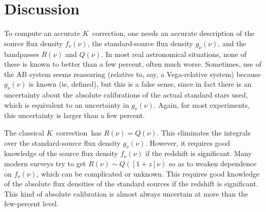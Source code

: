 \documentclass[preprint]{aastex}
\newcommand{\kcorrection}{$K$~correction}
\begin{document}
\section{Discussion}

To compute an accurate \kcorrection, one needs an accurate description
of the source flux density $f_{\nu}(\nu)$, the standard-source flux
density $g_{\nu}(\nu)$, and the bandpasses $R(\nu)$ and $Q(\nu)$.  In
most real astronomical situations, none of these is known to better
than a few percent, often much worse.  Sometimes, use of the AB system
seems reassuring (relative to, say, a Vega-relative system) because
$g_{\nu}(\nu)$ is known (ie, defined), but this is a false sense,
since in fact there is an uncertainty about the absolute calibrations
of the actual standard stars used, which is equivalent to an
uncertainty in $g_{\nu}(\nu)$.  Again, for most experiments, this
uncertainty is larger than a few percent.

The classical \kcorrection\ has $R(\nu)=Q(\nu)$.  This eliminates the
integrals over the standard-source flux density $g_{\nu}(\nu)$.
However, it requires good knowledge of the source flux density
$f_{\nu}(\nu)$ if the redshift is significant.  Many modern surveys
try to get $R(\nu)\sim Q([1+z]\nu)$ so as to weaken dependence on
$f_{\nu}(\nu)$, which can be complicated or unknown.  This requires
good knowledge of the absolute flux densities of the standard sources
if the redshift is significant.  This kind of absolute calibration is
almost always uncertain at more than the few-percent level.



\end{document}
